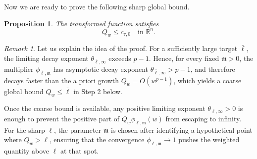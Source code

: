 \documentclass[reqno,12pt]{amsart}
\numberwithin{equation}{section}
\newtheorem{prop}[thm]{Proposition}
\theoremstyle{remark}
\newtheorem{rem}[thm]{Remark}
\newcommand{\R}{\mathbb R}
\begin{document}
Now we are ready to prove the following sharp global bound. 
\begin{prop}\label{prop:Q-bound}
The transformed function satisfies
\begin{equation}\label{eq:Qw-upper} 
Q_w\le c_{\tau,0} \quad\text{in }\R^n.
\end{equation}
\end{prop}
\begin{rem}\label{rem:two-stage-Q-bound}
Let us explain the idea of the proof. 
For a sufficiently large target $\bar\ell$, the limiting decay
exponent  $\theta_{\bar\ell,\infty}$ exceeds $p-1$.  Hence, for every fixed $\mathfrak m>0$, the multiplier
$\phi_{\bar\ell,\mathfrak m}$ has asymptotic decay exponent
$\theta_{\bar\ell,\infty}>p-1$, and therefore decays faster than the a priori growth $Q_w=O(w^{p-1})$, which yields a coarse global bound $Q_w\le\bar\ell$ in   Step 2 below.

Once the coarse bound is available, any positive limiting exponent $\theta_{\ell,\infty}>0$ is enough to prevent the positive part of $Q_w\phi_{\ell,\mathfrak m}(w)$ from escaping to infinity.
For the sharp $\ell$, the parameter $\mathfrak m$ is chosen after identifying a hypothetical point where $Q_w > \ell$, ensuring that the  convergence $\phi_{\ell,\mathfrak m} \to 1$ pushes the weighted quantity above $\ell$ at that spot.

\end{rem}
\end{document}
